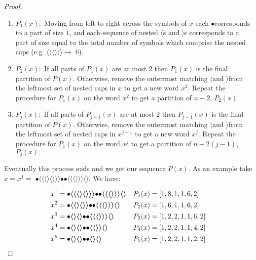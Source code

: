 \documentclass[11pt]{article} %
\newcommand{\lcap}{\boldmath$\langle$\unboldmath}
\newcommand{\rcap}{\boldmath$\rangle$\unboldmath}
\newcommand{\dotmap}{$\bullet$}
\begin{document}
\begin{proof}
\begin{enumerate}
\item $P_1(x):$ Moving from left to right across the symbols of $x$ each \dotmap\hspace{1mm}corresponds to a part of size $1$, and each sequence of nested \lcap s and \rcap s corresponds to a part of size equal to the total number of symbols which comprise the nested caps (e.g. \lcap\lcap\lcap\rcap\rcap\rcap $\mapsto$ 6).
\item $P_2(x):$ If all parts of $P_1(x)$ are at most $2$ then $P_1(x)$ is the final partition of $P(x)$. Otherwise, remove the outermost matching \lcap and \rcap\hspace{1mm}from the leftmost set of nested caps in $x$ to get a new word $x^2$. Repeat the procedure for $P_1(x)$ on the word $x^2$ to get a partition of $n-2$, $P_2(x)$
\item $P_j(x):$ If all parts of $P_{j-1}(x)$ are at most $2$ then $P_{j-1}(x)$ is the final partition of $P(x)$. Otherwise, remove the outermost matching \lcap and \rcap\hspace{1mm}from the leftmost set of nested caps in $x^{j-1}$ to get a new word $x^{j}$. Repeat the procedure for $P_1(x)$ on the word $x^j$ to get a partition of $n-2(j-1)$, $P_j(x).$
\end{enumerate}

Eventually this process ends and we get our sequence $P(x)$. As an example take $x=x^1=$ \dotmap\lcap\lcap\lcap\rcap\lcap\rcap\rcap\rcap\dotmap\dotmap\lcap\lcap\lcap\rcap\rcap\rcap\lcap\rcap. We have:

\begin{align*}
x^1&= \text{\dotmap\lcap\lcap\lcap\rcap\lcap\rcap\rcap\rcap\dotmap\dotmap\lcap\lcap\lcap\rcap\rcap\rcap\lcap\rcap} &P_1(x)&=[1,8,1,1,6,2] \\
x^2&= \text{\dotmap\lcap\lcap\rcap\lcap\rcap\rcap\dotmap\dotmap\lcap\lcap\lcap\rcap\rcap\rcap\lcap\rcap} &P_2(x)&=[1,6,1,1,6,2] \\
x^3&= \text{\dotmap\lcap\rcap\lcap\rcap\dotmap\dotmap\lcap\lcap\lcap\rcap\rcap\rcap\lcap\rcap} &P_3(x)&=[1,2,2,1,1,6,2] \\
x^4&= \text{\dotmap\lcap\rcap\lcap\rcap\dotmap\dotmap\lcap\lcap\rcap\rcap\lcap\rcap} &P_4(x)&=[1,2,2,1,1,4,2] \\
x^5&= \text{\dotmap\lcap\rcap\lcap\rcap\dotmap\dotmap\lcap\rcap\lcap\rcap} &P_5(x)&=[1,2,2,1,1,2,2] 
\end{align*}

\end{proof}
\end{document}
